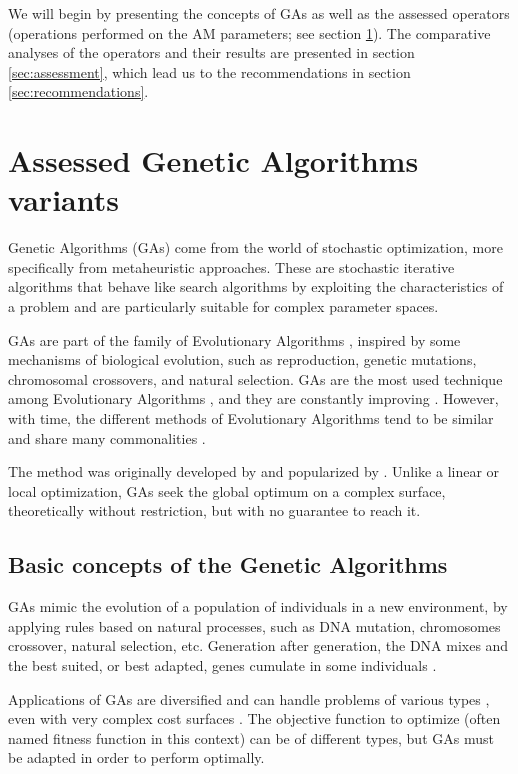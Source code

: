 \documentclass{ametsoc}
\begin{document}
We will begin by presenting the concepts of GAs as well as the assessed operators (operations performed on the AM parameters; see section \ref{sec:gas}). The comparative analyses of the operators and their results are presented in section \ref{sec:assessment}, which lead us to the recommendations in section \ref{sec:recommendations}.


\section{Assessed Genetic Algorithms variants}
\label{sec:gas}

Genetic Algorithms (GAs) come from the world of stochastic optimization, more specifically from metaheuristic approaches. These are stochastic iterative algorithms that behave like search algorithms by exploiting the characteristics of a problem and are particularly suitable for complex parameter spaces.

GAs are part of the family of Evolutionary Algorithms \citep{Back1993b, Schwefel1993}, inspired by some mechanisms of biological evolution, such as reproduction, genetic mutations, chromosomal crossovers, and natural selection. GAs are the most used technique among Evolutionary Algorithms \citep{Back1993b}, and they are constantly improving \citep{Haupt2004}. However, with time, the different methods of Evolutionary Algorithms tend to be similar and share many commonalities \citep{Back1996b, Haupt2004}.

The method was originally developed by \citet{Holland1992b} and popularized by \citet{Goldberg1989}. Unlike a linear or local optimization, GAs seek the global optimum on a complex surface, theoretically without restriction, but with no guarantee to reach it.


\subsection{Basic concepts of the Genetic Algorithms}

GAs mimic the evolution of a population of individuals in a new environment, by applying rules based on natural processes, such as DNA mutation, chromosomes crossover, natural selection, etc. Generation after generation, the DNA mixes and the best suited, or best adapted, genes cumulate in some individuals \citep{Beasley1996a}.

Applications of GAs are diversified and can handle problems of various types \citep{Joines1996a}, even with very complex cost surfaces \citep{Haupt2004}. The objective function to optimize (often named fitness function in this context) can be of different types, but GAs must be adapted in order to perform optimally.
\end{document}
